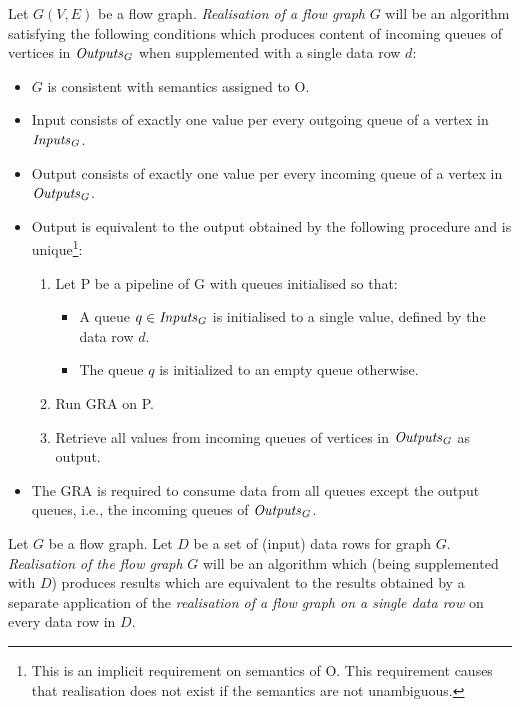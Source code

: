   Let $G(V,E)$ be a flow graph. \emph{Realisation of a flow graph} $G$ will be an algorithm satisfying the following conditions which produces content of incoming queues of vertices in $\mf{outputs_G}$ when supplemented with a single data row $d$: 
  \begin{itemize}
    \item $G$ is consistent with semantics assigned to O.
    \item Input consists of exactly one value per every outgoing queue of a vertex in $\mf{inputs_G}$.
    \item Output consists of exactly one value per every incoming queue of a vertex in $\mf{outputs_G}$.
    \item Output is equivalent to the output obtained by the following procedure and is unique\footnote{This is an implicit requirement on semantics of O. This requirement causes that realisation does not exist if the semantics are not unambiguous.}:
    \begin{enumerate}
      \item Let P be a pipeline of G with queues initialised so that:
      \begin{itemize}
        \item A queue $q \in \mf{inputs_G}$ is initialised to a single value, defined by the data row $d$.
        \item The queue $q$ is initialized to an empty queue otherwise.
      \end{itemize}
      \item Run GRA on P.
      \item Retrieve all values from incoming queues of vertices in $\mf{outputs_G}$ as output.
    \end{enumerate}
  \item The GRA is required to consume data from all queues except the output queues, i.e., the incoming queues of $\mf{outputs_G}$.
  \end{itemize}
\myenddef


  Let $G$ be a flow graph. Let $D$ be a set of (input) data rows for graph $G$. \emph{Realisation of the flow graph} $G$ will be an algorithm which (being supplemented with $D$) produces results which are equivalent to the results obtained by a separate application of the \emph{realisation of a flow graph on a single data row} on every data row in $D$. 
\myenddef


